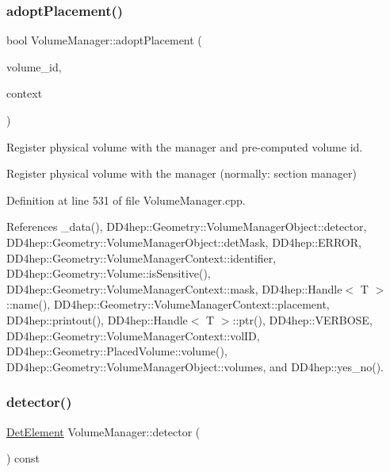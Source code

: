 \subsubsection{\texorpdfstring{adopt\+Placement()}{adoptPlacement()}\hspace{0.1cm}{\footnotesize\ttfamily [2/2]}}
{\footnotesize\ttfamily bool Volume\+Manager\+::adopt\+Placement (\begin{DoxyParamCaption}\item[{\hyperlink{class_d_d4hep_1_1_geometry_1_1_volume_manager_ab1f746b561c93be38bc7c6e66fc8ca8a}{Volume\+ID}}]{volume\+\_\+id,  }\item[{\hyperlink{class_d_d4hep_1_1_geometry_1_1_volume_manager_adadb14f2ccbeaad001b7bc6ddb6dc715}{Context} $\ast$}]{context }\end{DoxyParamCaption})}



Register physical volume with the manager and pre-\/computed volume id. 

Register physical volume with the manager (normally\+: section manager) 

Definition at line 531 of file Volume\+Manager.\+cpp.



References \+\_\+data(), D\+D4hep\+::\+Geometry\+::\+Volume\+Manager\+Object\+::detector, D\+D4hep\+::\+Geometry\+::\+Volume\+Manager\+Object\+::det\+Mask, D\+D4hep\+::\+E\+R\+R\+OR, D\+D4hep\+::\+Geometry\+::\+Volume\+Manager\+Context\+::identifier, D\+D4hep\+::\+Geometry\+::\+Volume\+::is\+Sensitive(), D\+D4hep\+::\+Geometry\+::\+Volume\+Manager\+Context\+::mask, D\+D4hep\+::\+Handle$<$ T $>$\+::name(), D\+D4hep\+::\+Geometry\+::\+Volume\+Manager\+Context\+::placement, D\+D4hep\+::printout(), D\+D4hep\+::\+Handle$<$ T $>$\+::ptr(), D\+D4hep\+::\+V\+E\+R\+B\+O\+SE, D\+D4hep\+::\+Geometry\+::\+Volume\+Manager\+Context\+::vol\+ID, D\+D4hep\+::\+Geometry\+::\+Placed\+Volume\+::volume(), D\+D4hep\+::\+Geometry\+::\+Volume\+Manager\+Object\+::volumes, and D\+D4hep\+::yes\+\_\+no().

\hypertarget{class_d_d4hep_1_1_geometry_1_1_volume_manager_a0da5e3f504392edecef3b1f1f3c7b111}{}\label{class_d_d4hep_1_1_geometry_1_1_volume_manager_a0da5e3f504392edecef3b1f1f3c7b111} 
\subsubsection{\texorpdfstring{detector()}{detector()}}
{\footnotesize\ttfamily \hyperlink{class_d_d4hep_1_1_geometry_1_1_det_element}{Det\+Element} Volume\+Manager\+::detector (\begin{DoxyParamCaption}{ }\end{DoxyParamCaption}) const}



